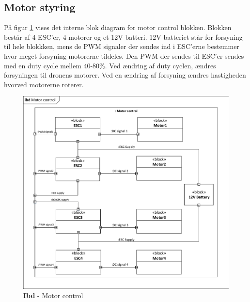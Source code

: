 \subsection{Motor styring}

På figur \ref{fig:ibd_motorcontrol} vises det interne blok diagram for motor control blokken. Blokken består af 4 ESC'er, 4 motorer og et 12V batteri. 12V batteriet står for forsyning til hele blokkken, mens de PWM signaler der sendes ind i ESC'erne bestemmer hvor meget forsyning motorerne tildeles. Den PWM der sendes til ESC'er sendes med en duty cycle mellem 40-80\%. Ved ændring af duty cyclen, ændres forsyningen til dronens motorer. Ved en ændring af forsyning ændres hastigheden hvorved motorerne roterer.

\begin{figure}[H]
\centering
\includegraphics[width=1\textwidth]{Billeder/IBD/ibd6_motorcontrol.pdf}
\vspace{-0.5cm}
\caption{\textbf{Ibd} - Motor control}
\label{fig:ibd_motorcontrol}
\end{figure}

